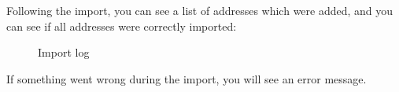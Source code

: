 \vspace{\baselineskip}

Following the import, you can see a list of addresses which were added, and you can see if all addresses were correctly imported:

\begin{figure}[H]
\caption{Import log}
\end{figure}

If something went wrong during the import, you will see an error message.